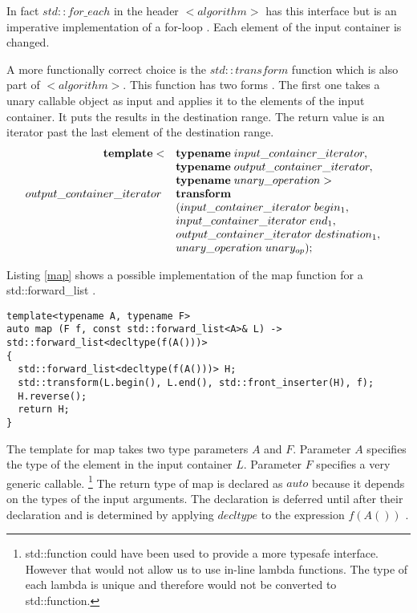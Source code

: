 \documentclass[12pt,fleqn]{article}
\begin{document}
In fact $std::for\_each$ in the header $<algorithm>$ has this interface but is an imperative implementation of a for-loop \cite{std::foreach, josuttis}.
Each element of the input container is changed.

A more functionally correct choice is the $std::transform$ function which is also part of $<algorithm>$. 
This function has two forms \cite{jouttis, std::transform}.
The first one takes a unary callable object as input and applies it to the elements of the input container.
It puts the results in the destination range. 
The return value is an iterator past the last element of the destination range. 
\[
\begin{array}{rll}
\mbox{\bf template}<&\mbox{\bf typename}\; input\_container\_iterator, \\
               &\mbox{\bf typename} \; output \_container\_iterator, \\
             &\mbox{\bf typename} \; unary\_operation >&\\
output\_container\_iterator\;& \mbox{\bf transform}\\
&( input\_container\_iterator\; begin_1, \\
& input\_container\_iterator \; end_1, \\
& output\_container\_iterator \; destination_1, \\
& unary\_operation \; unary_{op} );
\end{array}
\]

Listing \ref{map} shows a possible implementation of the map function for a std::forward\_list \cite{std::forward_list, josuttis}.

\begin{lstlisting}[caption=map for std::forward\_list,label=map]
template<typename A, typename F>
auto map (F f, const std::forward_list<A>& L) -> std::forward_list<decltype(f(A()))>
{
  std::forward_list<decltype(f(A()))> H;
  std::transform(L.begin(), L.end(), std::front_inserter(H), f);
  H.reverse();
  return H;
}
\end{lstlisting}

The template for map takes two type parameters $A$ and $F$. 
Parameter $A$ specifies the type of the element in the input container $L$.  
Parameter $F$ specifies a very generic callable. 
\footnote{
std::function could have been used to provide a more typesafe interface.
However that would not allow us to use in-line lambda functions.
The type of each lambda is unique and therefore would not be converted to std::function.
}
The return type of map is declared as $auto$ because it depends on the types of the input arguments.
The declaration is deferred until after their declaration and is determined by applying $decltype$ to the expression $f(A())$ \cite{josuttis, auto, decltype}.
\end{document}

